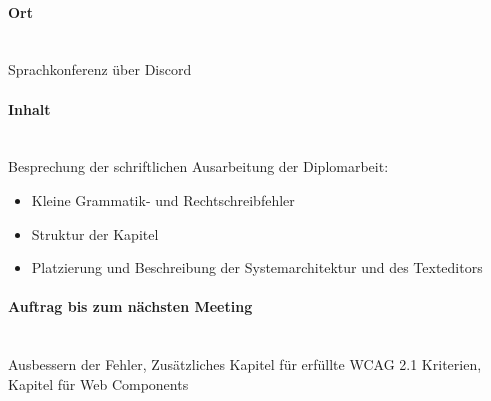 \paragraph{Ort}\mbox{}\\
Sprachkonferenz über Discord

\paragraph{Inhalt}\mbox{}\\
Besprechung der schriftlichen Ausarbeitung der Diplomarbeit:
\begin{itemize}
	\item{Kleine Grammatik- und Rechtschreibfehler}
	\item{Struktur der Kapitel}
	\item{Platzierung und Beschreibung der Systemarchitektur und des Texteditors}
\end{itemize}

\paragraph{Auftrag bis zum nächsten Meeting}\mbox{}\\
Ausbessern der Fehler, Zusätzliches Kapitel für erfüllte WCAG 2.1 Kriterien, Kapitel für Web Components